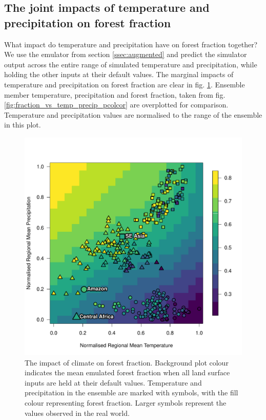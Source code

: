\documentclass[gmd, manuscript]{copernicus}
\begin{document}
\subsection{The joint impacts of temperature and precipitation on forest fraction}\label{ssec:joint}
What impact do temperature and precipitation have on forest fraction together? We use the emulator from section \ref{ssec:augmented} and predict the simulator output across the entire range of simulated temperature and precipitation, while holding the other inputs at their default values. The marginal impacts of temperature and precipitation on forest fraction are clear in fig. \ref{fig:taat_temp_precip_quilt}. Ensemble member temperature, precipitation and forest fraction, taken from fig. \ref{fig:fraction_vs_temp_precip_pcolcor} are overplotted for comparison. Temperature and precipitation values are normalised to the range of the ensemble in this plot.

\begin{figure}[t]
\includegraphics[width=12cm]{../graphics/taat_temp_precip_quilt.pdf}
\caption{The impact of climate on forest fraction. Background plot colour indicates the mean emulated forest fraction when all land surface inputs are held at their default values. Temperature and precipitation in the ensemble are marked with symbols, with the fill colour representing forest fraction. Larger symbols represent the values observed in the real world.
}
\label{fig:taat_temp_precip_quilt}
\end{figure}
\end{document}
